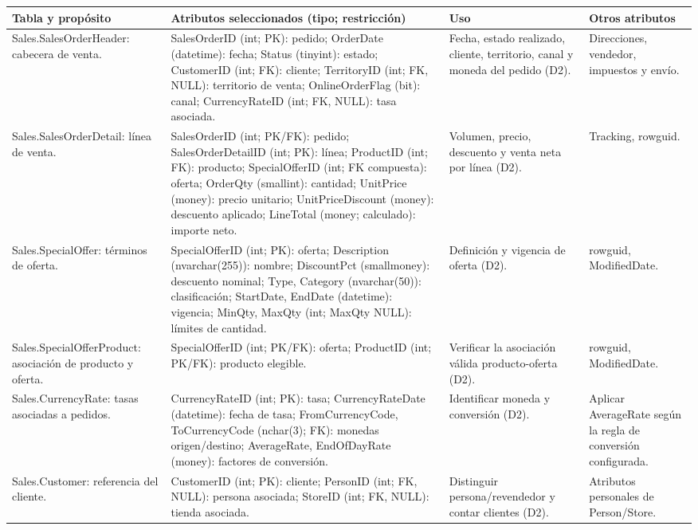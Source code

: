 \documentclass[10pt,a4paper]{article}
\begin{document}
\small
\begin{longtable}{p{}p{}p{}p{}}
\toprule
\textbf{Tabla y propósito} & \textbf{Atributos seleccionados (tipo; restricción)} &
\textbf{Uso} & \textbf{Otros atributos}\\
\midrule
\endhead
Sales.\allowbreak SalesOrderHeader: cabecera de venta. &
SalesOrderID (int; PK): pedido; OrderDate (datetime): fecha; Status (tinyint):
estado; CustomerID (int; FK): cliente; TerritoryID (int; FK, NULL): territorio
de venta; OnlineOrderFlag (bit): canal; CurrencyRateID (int; FK, NULL): tasa
asociada. & Fecha, estado realizado, cliente, territorio, canal y moneda del
pedido (D2). & Direcciones, vendedor, impuestos y envío.\\
Sales.\allowbreak SalesOrderDetail: línea de venta. &
SalesOrderID (int; PK/FK): pedido; SalesOrderDetailID (int; PK): línea;
ProductID (int; FK): producto; SpecialOfferID (int; FK compuesta): oferta;
OrderQty (smallint): cantidad; UnitPrice (money): precio unitario;
UnitPriceDiscount (money): descuento aplicado; LineTotal (money; calculado):
importe neto. & Volumen, precio, descuento y venta neta por línea (D2). &
Tracking, rowguid.\\
Sales.\allowbreak SpecialOffer: términos de oferta. &
SpecialOfferID (int; PK): oferta; Description (nvarchar(255)): nombre;
DiscountPct (smallmoney): descuento nominal; Type, Category (nvarchar(50)):
clasificación; StartDate, EndDate (datetime): vigencia; MinQty, MaxQty (int;
MaxQty NULL): límites de cantidad. & Definición y vigencia de oferta (D2). &
rowguid, ModifiedDate.\\
Sales.\allowbreak SpecialOfferProduct: asociación de producto y oferta. &
SpecialOfferID (int; PK/FK): oferta; ProductID (int; PK/FK): producto
elegible. & Verificar la asociación válida producto-oferta (D2). &
rowguid, ModifiedDate.\\
Sales.\allowbreak CurrencyRate: tasas asociadas a pedidos. &
CurrencyRateID (int; PK): tasa; CurrencyRateDate (datetime): fecha de tasa;
FromCurrencyCode, ToCurrencyCode (nchar(3); FK): monedas origen/destino;
AverageRate, EndOfDayRate (money): factores de conversión. & Identificar
moneda y conversión (D2). & Aplicar AverageRate según la regla de conversión
configurada.\\
Sales.\allowbreak Customer: referencia del cliente. &
CustomerID (int; PK): cliente; PersonID (int; FK, NULL): persona asociada;
StoreID (int; FK, NULL): tienda asociada. & Distinguir persona/revendedor y
contar clientes (D2). & Atributos personales de Person/Store.\\

\end{longtable}
\end{document}
